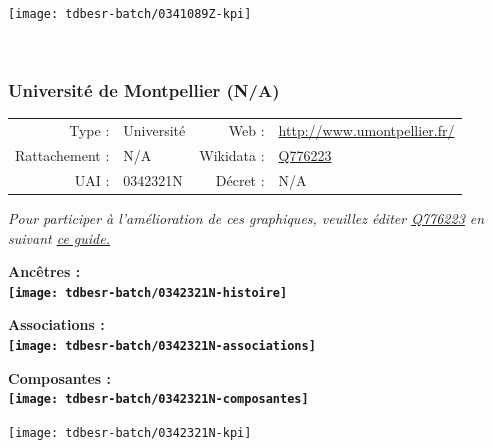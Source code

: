 \documentclass[12pt,french,]{article}
\begin{document}
\begin{center}\texttt{[image: tdbesr-batch/0341089Z-kpi]} \end{center}\checkoddpage

\ifoddpage ~\newpage \fi   

\hypertarget{universituxe9-de-montpellier-na}{%
\subsubsection{Université de Montpellier
(N/A)}\label{universituxe9-de-montpellier-na}}

\begin{tabular*}{\textwidth}{rp{5cm}rl}  
\hline  
Type : & Université & Web : &\href{http://www.umontpellier.fr/}{http://www.umontpellier.fr/} \\  
Rattachement : & N/A & Wikidata : & \href{https://www.wikidata.org/entity/Q776223}{Q776223} \\  
UAI : & 0342321N & Décret : & N/A \\  
\hline  
\end{tabular*}

\textit{\scriptsize Pour participer à l'amélioration de ces graphiques, veuillez éditer  \href{https://www.wikidata.org/entity/Q776223}{Q776223}  en suivant \href{https://github.com/cpesr/wikidataESR/blob/master/Rmd/wikidataESR.md}{ce guide.}}

\vspace{1cm}  
\begin{minipage}[b]{0.50\textwidth}\begin{center} \bf Ancêtres : \\  
\texttt{[image: tdbesr-batch/0342321N-histoire]} \end{center}\end{minipage}\begin{minipage}[b]{0.50\textwidth}\begin{center} \bf Associations : \\  
\texttt{[image: tdbesr-batch/0342321N-associations]} \end{center}\end{minipage}

\hrulefill

\begin{center} \bf Composantes : \\  
\texttt{[image: tdbesr-batch/0342321N-composantes]} \end{center}

\begin{center}\texttt{[image: tdbesr-batch/0342321N-kpi]} \end{center}\checkoddpage
\end{document}
